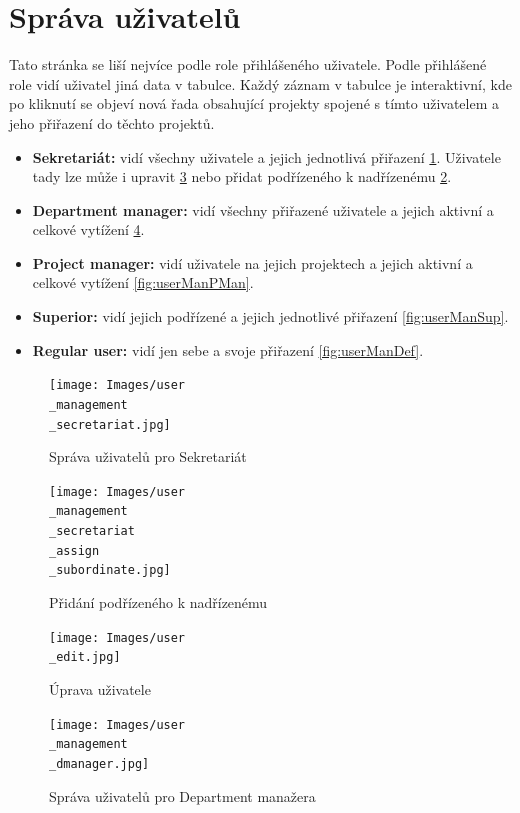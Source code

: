 \documentclass[czech,P5]{thesiskiv}
\begin{document}
\section{Správa uživatelů}
Tato stránka se liší nejvíce podle role přihlášeného uživatele. Podle přihlášené role vidí uživatel jiná data v tabulce. Každý záznam v tabulce je interaktivní, kde po kliknutí se objeví nová řada obsahující projekty spojené s tímto uživatelem a jeho přiřazení do těchto projektů.
\begin{itemize}
             \item \textbf{Sekretariát:} vidí všechny uživatele a jejich jednotlivá přiřazení \ref{fig:userManSec}. Uživatele tady lze může i upravit \ref{fig:userEdit} nebo přidat podřízeného k nadřízenému \ref{fig:userManAddSub}.
             \item \textbf{Department manager:} vidí všechny přiřazené uživatele a jejich aktivní a celkové vytížení \ref{fig:userManDMan}.
             \item \textbf{Project manager:} vidí uživatele na jejich projektech a jejich aktivní a celkové vytížení \ref{fig:userManPMan}.
             \item \textbf{Superior:} vidí jejich podřízené a jejich jednotlivé přiřazení \ref{fig:userManSup}.
             \item \textbf{Regular user:} vidí jen sebe a svoje přiřazení \ref{fig:userManDef}.
\end{itemize}
 \begin{figure}[H]
	\centering
	\texttt{[image: Images/user\\\_management\\\_secretariat.jpg]}
	\caption{Správa uživatelů pro Sekretariát}
	\label{fig:userManSec} 
\end{figure}
 \begin{figure}[H]
	\centering
	\texttt{[image: Images/user\\\_management\\\_secretariat\\\_assign\\\_subordinate.jpg]}
	\caption{Přidání podřízeného k nadřízenému}
	\label{fig:userManAddSub} 
\end{figure}
 \begin{figure}[H]
	\centering
	\texttt{[image: Images/user\\\_edit.jpg]}
	\caption{Úprava uživatele}
	\label{fig:userEdit} 
\end{figure}
 \begin{figure}[H]
	\centering
	\texttt{[image: Images/user\\\_management\\\_dmanager.jpg]}
	\caption{Správa uživatelů pro Department manažera}
	\label{fig:userManDMan} 
\end{figure}
\end{document}
